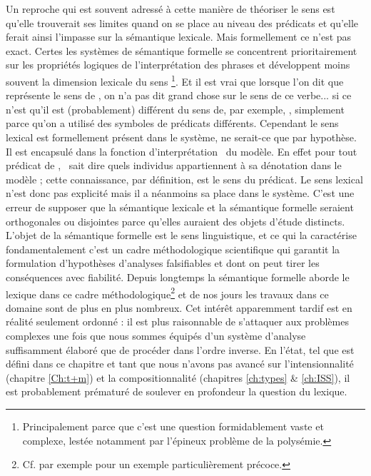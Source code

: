 Un reproche qui est souvent adressé à cette manière de théoriser le sens est qu'elle trouverait ses limites quand on se place au niveau des prédicats et qu'elle ferait ainsi l'impasse sur la sémantique lexicale.  Mais formellement ce n'est pas exact.  
Certes les systèmes de sémantique formelle se concentrent prioritairement sur les propriétés logiques de l'interprétation des phrases et  
développent moins souvent la dimension lexicale du sens%
\footnote{Principalement parce que c'est une question formidablement vaste et complexe, lestée notamment par l'épineux problème de la polysémie.}.
Et il est vrai que lorsque l'on dit que  représente le sens de , on n'a pas dit grand chose sur le sens de ce verbe... si ce n'est qu'il est (probablement) différent du sens de, par exemple, , simplement parce qu'on a utilisé des symboles de prédicats différents.  
Cependant le sens lexical est formellement présent dans le système, ne serait-ce que par hypothèse.  Il est encapsulé dans la fonction d'interprétation \FI\ du modèle.  En effet pour tout prédicat de {\LO}, \FI\ sait dire quels individus appartiennent à sa dénotation dans le modèle ; cette connaissance, par définition, est le sens du prédicat.  
Le sens lexical n'est donc pas explicité mais il a néanmoins sa place %
dans le système.
C'est une erreur de supposer que la sémantique lexicale et la sémantique formelle seraient orthogonales ou disjointes parce qu'elles auraient des objets d'étude distincts.  
L'objet de la sémantique formelle est le sens linguistique, et ce qui la caractérise fondamentalement c'est un cadre méthodologique scientifique qui garantit la formulation d'hypothèses d'analyses falsifiables et dont on peut tirer les conséquences avec fiabilité. 
Depuis longtemps la sémantique formelle aborde le lexique dans ce cadre méthodologique\footnote{Cf. par exemple \cite{Dow:79} pour un exemple particulièrement précoce.} et de nos jours les travaux dans ce domaine sont de plus en plus nombreux.  
Cet intérêt apparemment tardif est en réalité seulement ordonné : il est plus raisonnable de s'attaquer aux problèmes complexes une fois que nous sommes équipés d'un système d'analyse suffisamment élaboré que de procéder dans l'ordre inverse.  En l'état, tel que {\LO} est défini dans ce chapitre et tant que nous n'avons pas avancé sur l'intensionnalité (chapitre \ref{Ch:t+m}) et la compositionnalité (chapitres \ref{ch:types} \& \ref{ch:ISS}),
il est probablement prématuré de soulever en profondeur la question du lexique.



